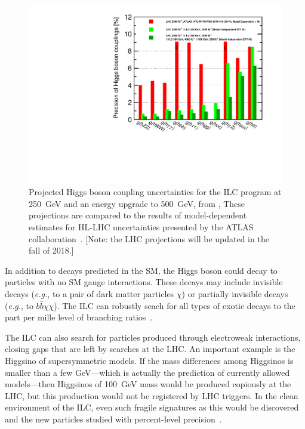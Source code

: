 \documentclass[%
 reprint,
 amsmath,amssymb,
 aps,
]{revtex4-1}
\def\eg{{\it e.g.}}
\begin{document}
\begin{figure}
\begin{center}
\includegraphics[width=0.95\hsize]{figures/DeltaH_EFT.pdf}
\end{center}
\caption{Projected Higgs boson coupling uncertainties for the ILC
  program at 250~GeV and an energy upgrade to 500~GeV, from \cite{Fujii:2017vwa}, 
 These projections are compared to
  the results of model-dependent estimates for HL-LHC uncertainties 
presented by the ATLAS 
collaboration~\cite{H2aaLHC}. [Note: the LHC projections will be
updated in the fall of 2018.]}
\label{fig:Higgssummary}
\end{figure}

In addition to decays predicted in the SM, the Higgs boson could decay
to particles with no SM gauge interactions.    These decays may
include invisible decays (\eg, to a pair of dark matter particles $\chi$)  or
partially invisible decays (\eg, to $b\bar b \chi \chi$).   The ILC
can robustly seach for all types of exotic decays  to the part per
mille level of branching ratios~\cite{Liu:2016zki}.

The ILC can also search for particles produced through electroweak
interactions, closing gaps that are left by searches at the LHC.  An
important example is the Higgsino of supersymmetric models.   If the
mass  differences among Higgsinos is smaller than a few GeV---which is
actually the prediction of currently allowed models---then Higgsinos
of 100~GeV mass would be produced copiously at the LHC, but this
production would not be registered by LHC triggers.  In the clean
environment 
of the ILC, even such fragile signatures as this 
would be discovered and the new particles 
studied with percent-level precision~\cite{Higgsino}.
\end{document}
